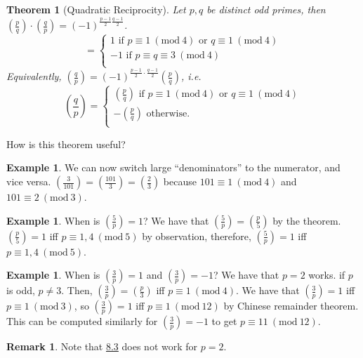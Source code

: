 \documentclass[11pt,letter]{article}
\newcommand{\legendre}[2]{\ensuremath{\left( \frac{#1}{#2} \right) }}
\newcommand{\Mod}[1]{\ (\mathrm{mod}\ #1)}
\newcommand{\2}{\{0, 1\}}
\newcommand{\1}{\mathds{1}}
\newcounter{nLectures}
\newcounter{nTheorems}[nLectures]
\newtheorem{theorem}[nTheorems]{Theorem}
\theoremstyle{definition}
\newtheorem{remark}[nTheorems]{Remark}
\newtheorem{example}[nTheorems]{Example}
\begin{document}
\begin{theorem}[Quadratic Reciprocity]\label{thm:thm_8_3}
    Let $p,q$ be distinct odd primes, then $\legendre{p}{q}\cdot\legendre{q}{p}=(-1)^{\frac{p-1}{2}\frac{q-1}{2}}$.
        \[
        =
        \begin{cases}
            1\text{ if }p\equiv 1\Mod 4\text{ or } q\equiv 1\Mod 4 \\
            -1\text{ if }p\equiv q\equiv 3\Mod 4 \\
        \end{cases}
        \]
    Equivalently, $\legendre{q}{p}=(-1)^{\frac{p-1}{2}\cdot\frac{q-1}{2}}\legendre{p}{q}$,
    i.e.
    \[
    \legendre{q}{p}=
    \begin{cases}
        \legendre{p}{q}\text{ if }p\equiv 1\Mod 4\text{ or } q\equiv 1\Mod 4 \\
        -\legendre{p}{q}\text{ otherwise. }\\
    \end{cases}
    \]
\end{theorem}
How is this theorem useful?
\begin{example}
    We can now switch large ``denominators'' to the numerator, and vice versa.
    $\legendre{3}{101}=\legendre{101}{3}=\legendre{2}{3}$ because $101\equiv 1\Mod 4$ and $101\equiv 2\Mod 3$.
\end{example}
\begin{example}
    When is $\legendre{5}{p}=1$? We have that $\legendre{5}{p}=\legendre{p}{5}$ by the theorem. $\legendre{p}{5}=1$
    iff $p\equiv 1,4\Mod 5$ by observation, therefore, $\legendre{5}{p}=1$ iff $p\equiv 1,4\Mod 5$.
\end{example}
\begin{example}
    When is $\legendre{3}{p}=1$ and $\legendre{3}{p}=-1$? We have that $p=2$ works. if $p$ is odd, $p\neq 3$.
    Then, $\legendre{3}{p}=\legendre{p}{3}$ iff $p\equiv 1\Mod 4$. We have that $\legendre{3}{p}=1$ iff $p\equiv 1\Mod 3$,
    so $\legendre{3}{p}=1$ iff $p\equiv 1\Mod{12}$ by Chinese remainder theorem. This can be computed similarly
    for $\legendre{3}{p}=-1$ to get $p\equiv 11\Mod{12}$.
\end{example}
\begin{remark}
    Note that \hyperref[thm:thm_8_3]{8.3} does not work for $p=2$.
\end{remark}
\end{document}
